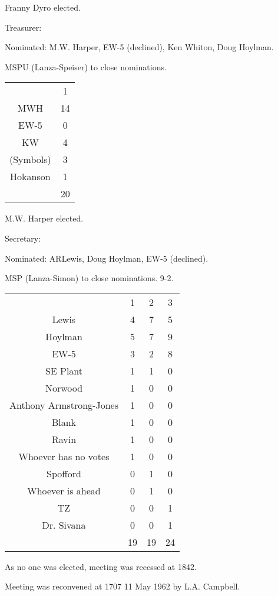 \documentclass[12pt]{article}
\begin{document}
Franny Dyro elected.

Treasurer:

Nominated: M.W. Harper, EW-5 (declined), Ken Whiton, Doug Hoylman.

MSPU (Lanza-Speiser) to close nominations.

\begin{center}
\begin{tabular}{ c c }
  & 1 \\ 
 MWH & 14 \\
 EW-5 & 0 \\
 KW & 4 \\
 (Symbols) & 3 \\
 Hokanson & 1 \\
  & 20 \\ 
\end{tabular}
\end{center}

M.W. Harper elected.

Secretary:

Nominated: ARLewis, Doug Hoylman, EW-5 (declined).

MSP (Lanza-Simon) to close nominations. 9-2.

\begin{center}
\begin{tabular}{ c c c c }
  & 1 & 2 & 3 \\ 
 Lewis & 4 & 7 & 5 \\
 Hoylman & 5 & 7 & 9 \\
 EW-5 & 3 & 2 & 8 \\
 SE Plant & 1 & 1 & 0 \\
 Norwood & 1 & 0 & 0 \\
 Anthony Armstrong-Jones & 1 & 0 & 0 \\
 Blank & 1 & 0 & 0 \\
 Ravin & 1 & 0 & 0 \\
 Whoever has no votes & 1 & 0 & 0 \\
 Spofford & 0 & 1 & 0 \\
 Whoever is ahead & 0 & 1 & 0 \\
 TZ & 0 & 0 & 1 \\
 Dr. Sivana & 0 & 0 & 1 \\
  & 19 & 19 & 24 \\ 
\end{tabular}
\end{center}

As no one was elected, meeting was recessed at 1842.

Meeting was reconvened at 1707 11 May 1962 by L.A. Campbell.
\end{document}
